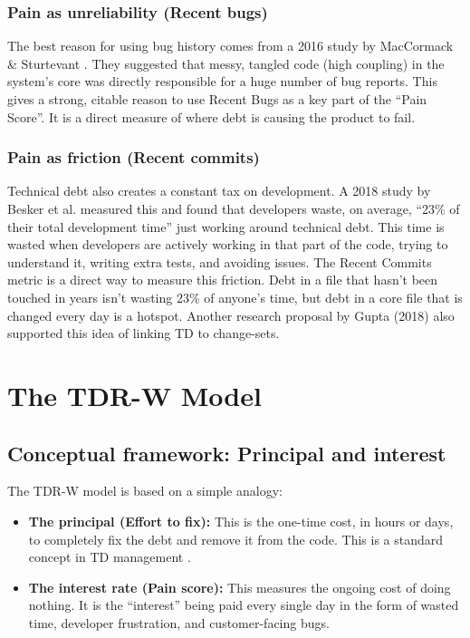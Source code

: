 \documentclass[journal]{IEEEtran}
\begin{document}
\subsubsection{Pain as unreliability (Recent bugs)}
The best reason for using bug history comes from a 2016 study by MacCormack \& Sturtevant \cite{b13}. They suggested that messy, tangled code (high coupling) in the system's core was directly responsible for a huge number of bug reports. This gives a strong, citable reason to use Recent Bugs as a key part of the ``Pain Score''. It is a direct measure of where debt is causing the product to fail.

\subsubsection{Pain as friction (Recent commits)}
Technical debt also creates a constant tax on development. A 2018 study by Besker et al. \cite{b8} measured this and found that developers waste, on average, ``23\% of their total development time'' just working around technical debt. This time is wasted when developers are actively working in that part of the code, trying to understand it, writing extra tests, and avoiding issues. The Recent Commits metric is a direct way to measure this friction. Debt in a file that hasn't been touched in years isn't wasting 23\% of anyone's time, but debt in a core file that is changed every day is a hotspot. Another research proposal by Gupta (2018) \cite{b2} also supported this idea of linking TD to change-sets.

\section{The TDR-W Model}

\subsection{Conceptual framework: Principal and interest}
The TDR-W model is based on a simple analogy:
\begin{itemize}
    \item \textbf{The principal (Effort to fix):} This is the one-time cost, in hours or days, to completely fix the debt and remove it from the code. This is a standard concept in TD management \cite{b7}.
    \item \textbf{The interest rate (Pain score):} This measures the ongoing cost of doing nothing. It is the ``interest'' being paid every single day in the form of wasted time, developer frustration, and customer-facing bugs.
\end{itemize}
\end{document}
